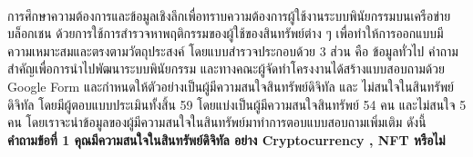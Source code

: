 \documentclass[12pt,oneside,openright,a4paper]{cpe-thai-project}
\begin{document}


\makeatletter
\g@addto@macro{\UrlBreaks}{\UrlOrds}
\makeatother



 \\
\tab การศึกษาความต้องการและข้อมูลเชิงลึกเพื่อทราบความต้องการผู้ใช้งานระบบพินัยกรรมบนเครือข่ายบล็อกเชน  ด้วยการใช้การสำรวจหาพฤติกรรมของผู้ใช้ของสินทรัพย์ต่าง ๆ เพื่อทำให้การออกแบบมีความเหมาะสมและตรงตามวัตถุประสงค์ โดยแบบสำรวจประกอบด้วย 3 ส่วน คือ ข้อมูลทั่วไป คำถามสำคัญเพื่อการนำไปพัฒนาระบบพินัยกรรม และทางคณะผู้จัดทำโครงงานได้สร้างแบบสอบถามด้วย Google Form และกำหนดให้ตัวอย่างเป็นผู้มีความสนใจสินทรัพย์ดิจิทัล และ ไม่สนใจในสินทรัพย์ดิจิทัล โดยมีผู้ตอบแบบประเมินทั้งสิ้น 59 โดยแบ่งเป็นผู้มีความสนใจสินทรัพย์ 54 คน และไม่สนใจ 5 คน โดยเราจะนำข้อมูลของผู้มีความสนใจในสินทรัพย์มาทำการตอบแบบสอบถามเพิ่มเติม ดังนี้\\

\bf คำถามข้อที่ 1 คุณมีความสนใจในสินทรัพย์ดิจิทัล อย่าง Cryptocurrency , NFT หรือไม่
\end{document}
